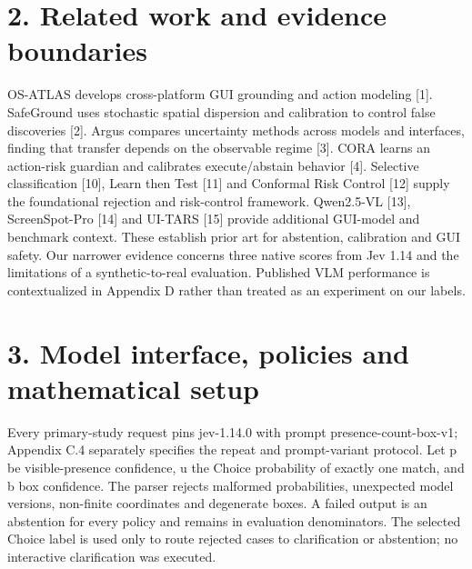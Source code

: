 \documentclass[10pt]{article}
\begin{document}
\section*{2. Related work and evidence boundaries}
OS-ATLAS develops cross-platform GUI grounding and action modeling [1]. SafeGround uses stochastic spatial dispersion and calibration to control false discoveries [2]. Argus compares uncertainty methods across models and interfaces, finding that transfer depends on the observable regime [3]. CORA learns an action-risk guardian and calibrates execute/abstain behavior [4]. Selective classification [10], Learn then Test [11] and Conformal Risk Control [12] supply the foundational rejection and risk-control framework. Qwen2.5-VL [13], ScreenSpot-Pro [14] and UI-TARS [15] provide additional GUI-model and benchmark context. These establish prior art for abstention, calibration and GUI safety. Our narrower evidence concerns three native scores from Jev 1.14 and the limitations of a synthetic-to-real evaluation. Published VLM performance is contextualized in Appendix D rather than treated as an experiment on our labels.

\section*{3. Model interface, policies and mathematical setup}
Every primary-study request pins jev-1.14.0 with prompt presence-count-box-v1; Appendix C.4 separately specifies the repeat and prompt-variant protocol. Let p be visible-presence confidence, u the Choice probability of exactly one match, and b box confidence. The parser rejects malformed probabilities, unexpected model versions, non-finite coordinates and degenerate boxes. A failed output is an abstention for every policy and remains in evaluation denominators. The selected Choice label is used only to route rejected cases to clarification or abstention; no interactive clarification was executed.
\end{document}

